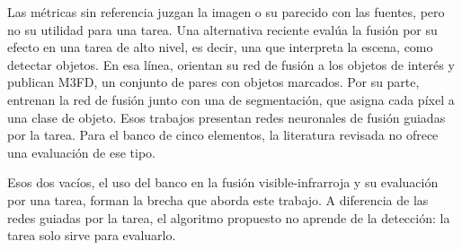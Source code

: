 Las métricas sin referencia juzgan la imagen o su parecido con las fuentes, pero no su utilidad para una
tarea. Una alternativa reciente evalúa la fusión por su efecto en una tarea de alto nivel, es decir, una
que interpreta la escena, como detectar objetos. En esa línea, \textcite{liu2022} orientan su red de
fusión a los objetos de interés y publican M3FD, un conjunto de pares con objetos marcados. Por su parte,
\textcite{tang2022} entrenan la red de fusión junto con una de segmentación, que asigna cada píxel a una
clase de objeto. Esos trabajos presentan redes neuronales de fusión guiadas por la tarea. Para el banco
de cinco elementos, la literatura revisada no ofrece una evaluación de ese tipo.

Esos dos vacíos, el uso del banco en la fusión visible-infrarroja y su evaluación por una tarea, forman
la brecha que aborda este trabajo. A diferencia de las redes guiadas por la tarea, el algoritmo
propuesto no aprende de la detección: la tarea solo sirve para evaluarlo.

